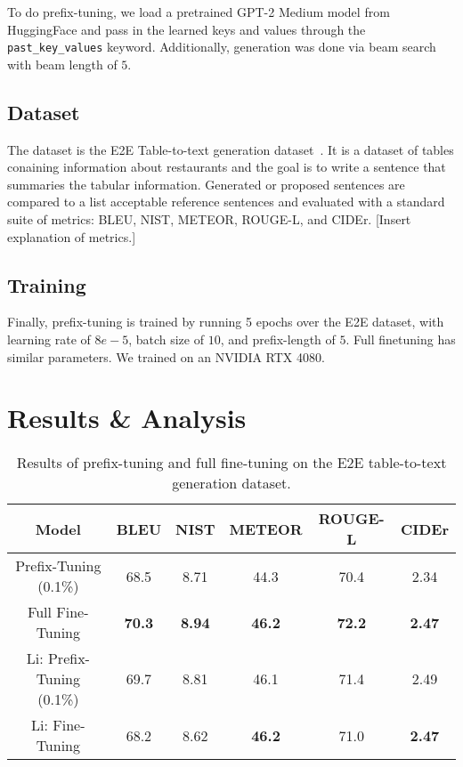 \documentclass[11pt]{article} %
\begin{document}
To do prefix-tuning, we load a pretrained GPT-2 Medium model from HuggingFace and pass in the learned keys and values through the \verb|past_key_values| keyword. Additionally, generation was done via beam search with beam length of $5$.

\subsection{Dataset}
The dataset is the E2E Table-to-text generation dataset~\cite{novikova-etal-2017-e2e}. It is a dataset of tables conaining information about restaurants and the goal is to write a sentence that summaries the tabular information. Generated or proposed sentences are compared to a list acceptable reference sentences and evaluated with a standard suite of metrics: BLEU, NIST, METEOR, ROUGE-L, and CIDEr. [Insert explanation of metrics.]

\subsection{Training}
Finally, prefix-tuning is trained by running 5 epochs over the E2E dataset, with learning rate of $8e-5$, batch size of $10$, and prefix-length of $5$. Full finetuning has similar parameters. We trained on an NVIDIA RTX 4080.

\section{Results \& Analysis}

\begin{table}[H]
    \centering
    \begin{tabular}{c|ccccc}
        \textbf{Model} & \textbf{BLEU} & \textbf{NIST} & \textbf{METEOR} & \textbf{ROUGE-L} & \textbf{CIDEr} \\
        \hline
        Prefix-Tuning (0.1\%) & 68.5 & 8.71 & 44.3 & 70.4 & 2.34 \\
        Full Fine-Tuning & \textbf{70.3} & \textbf{8.94} & \textbf{46.2} & \textbf{72.2} & \textbf{2.47}\\
        Li: Prefix-Tuning (0.1\%) & 69.7 & 8.81 & 46.1 & 71.4 & 2.49 \\
        Li: Fine-Tuning & 68.2 & 8.62 & \textbf{46.2} & {71.0} & \textbf{2.47}
    \end{tabular}
    \caption{Results of prefix-tuning and full fine-tuning on the E2E table-to-text generation dataset.}
    \label{tab:results}
\end{table}
\end{document}
